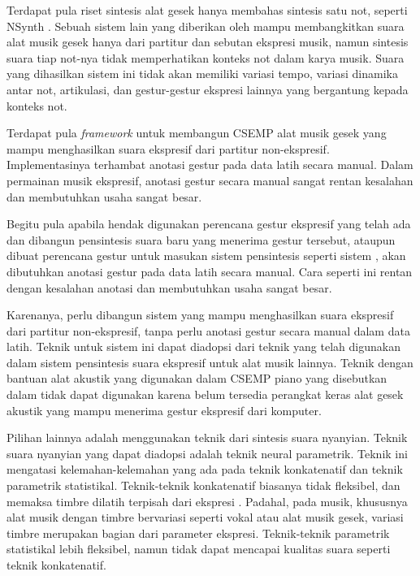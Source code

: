 Terdapat pula riset sintesis alat gesek hanya membahas sintesis satu not, seperti NSynth \parencite{nsynth2017}. Sebuah sistem lain yang diberikan oleh \citet{yang2016synthesis} mampu membangkitkan suara alat musik gesek hanya dari partitur dan sebutan ekspresi musik, namun sintesis suara tiap not-nya tidak memperhatikan konteks not dalam karya musik. Suara yang dihasilkan sistem ini tidak akan memiliki variasi tempo, variasi dinamika antar not, artikulasi, dan gestur-gestur ekspresi lainnya yang bergantung kepada konteks not.

Terdapat pula \textit{framework} untuk membangun CSEMP alat musik gesek yang mampu menghasilkan suara ekspresif dari partitur non-ekspresif. \parencite{perez2015} Implementasinya terhambat anotasi gestur pada data latih secara manual. Dalam permainan musik ekspresif, anotasi gestur secara manual sangat rentan kesalahan dan membutuhkan usaha sangat besar.

Begitu pula apabila hendak digunakan perencana gestur ekspresif yang telah ada \parencite{marchini2014quartet}\parencite{yu2017bowing} dan dibangun pensintesis suara baru yang menerima gestur tersebut, ataupun dibuat perencana gestur untuk masukan sistem pensintesis seperti sistem \citet{lindemann2007rpm}, akan dibutuhkan anotasi gestur pada data latih secara manual. Cara seperti ini rentan dengan kesalahan anotasi dan membutuhkan usaha sangat besar.

Karenanya, perlu dibangun sistem yang mampu menghasilkan suara ekspresif dari partitur non-ekspresif, tanpa perlu anotasi gestur secara manual dalam data latih. Teknik untuk sistem ini dapat diadopsi dari teknik yang telah digunakan dalam sistem pensintesis suara ekspresif untuk alat musik lainnya. Teknik dengan bantuan alat akustik yang digunakan dalam CSEMP piano yang disebutkan dalam \citet{schubert2017test} tidak dapat digunakan karena belum tersedia perangkat keras alat gesek akustik yang mampu menerima gestur ekspresif dari komputer.

Pilihan lainnya adalah menggunakan teknik dari sintesis suara nyanyian. Teknik suara nyanyian yang dapat diadopsi adalah teknik neural parametrik. Teknik ini mengatasi kelemahan-kelemahan yang ada pada teknik konkatenatif dan teknik parametrik statistikal\parencite{bonada2017singing}. Teknik-teknik konkatenatif \parencite{Bonada2016ExpressiveSS}\parencite{Bonada2007SynthesisOT} biasanya tidak fleksibel, dan memaksa timbre dilatih terpisah dari ekspresi \parencite{bonada2017singing}. Padahal, pada musik, khususnya alat musik dengan timbre bervariasi seperti vokal atau alat musik gesek, variasi timbre merupakan bagian dari parameter ekspresi. Teknik-teknik parametrik statistikal lebih fleksibel, namun tidak dapat mencapai kualitas suara seperti teknik konkatenatif.

